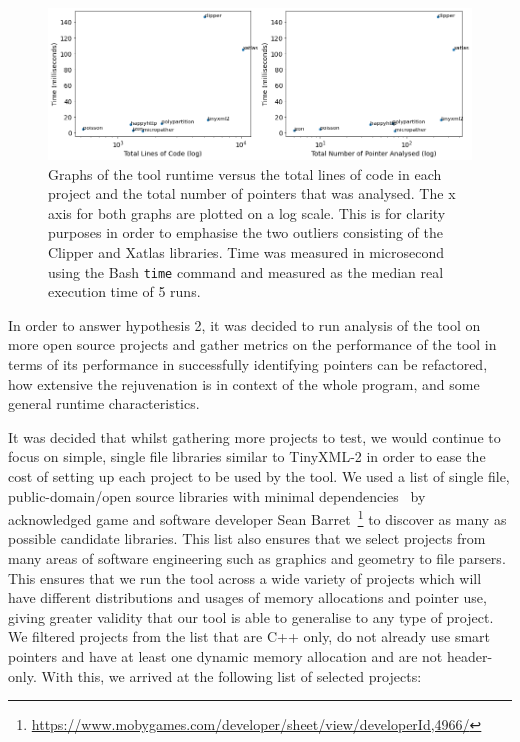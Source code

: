 \documentclass{mpaper}
\begin{document}
    \begin{figure}
        \centering
        \includegraphics[scale=0.55]{images/time.png}
        \caption{Graphs of the tool runtime versus the total lines of code in each project and the total number of pointers that was analysed. The x axis for both graphs are plotted on a log scale. This is for clarity purposes in order to emphasise the two outliers consisting of the Clipper and Xatlas libraries. Time was measured in microsecond using the Bash \texttt{time} command and measured as the median real execution time of 5 runs.}
        \label{fig:time}
    \end{figure}

    
    In order to answer hypothesis 2, it was decided to run analysis of the tool on more open source projects and gather metrics on the performance of the tool in terms of its performance in successfully identifying pointers can be refactored, how extensive the rejuvenation is in context of the whole program, and some general runtime characteristics. 
    
    It was decided that whilst gathering more projects to test, we would continue to focus on simple, single file libraries similar to TinyXML-2 in order to ease the cost of setting up each project to be used by the tool. 
    We used a list of single file, public-domain/open source libraries with minimal dependencies~\cite{Barrett2019} by acknowledged game and software developer Sean Barret~\footnote{\url{https://www.mobygames.com/developer/sheet/view/developerId,4966/}} to discover as many as possible candidate libraries.
    This list also ensures that we select projects from many areas of software engineering such as graphics and geometry to file parsers.
    This ensures that we run the tool across a wide variety of projects which will have different distributions and usages of memory allocations and pointer use, giving greater validity that our tool is able to generalise to any type of project.
    We filtered projects from the list that are C++ only, do not already use smart pointers and have at least one dynamic memory allocation and are not header-only.
    With this, we arrived at the following list of selected projects: 
    
\end{document}
